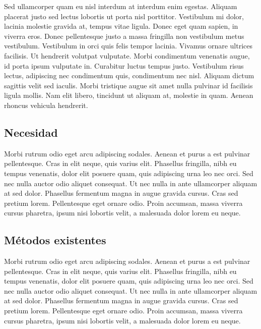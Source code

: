 Sed ullamcorper quam eu nisl interdum at interdum enim egestas. Aliquam placerat justo sed lectus lobortis ut porta nisl porttitor. Vestibulum mi dolor, lacinia molestie gravida at, tempus vitae ligula. Donec eget quam sapien, in viverra eros. Donec pellentesque justo a massa fringilla non vestibulum metus vestibulum. Vestibulum in orci quis felis tempor lacinia. Vivamus ornare ultrices facilisis. Ut hendrerit volutpat vulputate. Morbi condimentum venenatis augue, id porta ipsum vulputate in. Curabitur luctus tempus justo. Vestibulum risus lectus, adipiscing nec condimentum quis, condimentum nec nisl. Aliquam dictum sagittis velit sed iaculis. Morbi tristique augue sit amet nulla pulvinar id facilisis ligula mollis. Nam elit libero, tincidunt ut aliquam at, molestie in quam. Aenean rhoncus vehicula hendrerit.


\subsection{Necesidad}
Morbi rutrum odio eget arcu adipiscing sodales. Aenean et purus a est pulvinar pellentesque. Cras in elit neque, quis varius elit. Phasellus fringilla, nibh eu tempus venenatis, dolor elit posuere quam, quis adipiscing urna leo nec orci. Sed nec nulla auctor odio aliquet consequat. Ut nec nulla in ante ullamcorper aliquam at sed dolor. Phasellus fermentum magna in augue gravida cursus. Cras sed pretium lorem. Pellentesque eget ornare odio. Proin accumsan, massa viverra cursus pharetra, ipsum nisi lobortis velit, a malesuada dolor lorem eu neque.


\subsection{M\'etodos existentes}
Morbi rutrum odio eget arcu adipiscing sodales. Aenean et purus a est pulvinar pellentesque. Cras in elit neque, quis varius elit. Phasellus fringilla, nibh eu tempus venenatis, dolor elit posuere quam, quis adipiscing urna leo nec orci. Sed nec nulla auctor odio aliquet consequat. Ut nec nulla in ante ullamcorper aliquam at sed dolor. Phasellus fermentum magna in augue gravida cursus. Cras sed pretium lorem. Pellentesque eget ornare odio. Proin accumsan, massa viverra cursus pharetra, ipsum nisi lobortis velit, a malesuada dolor lorem eu neque.
